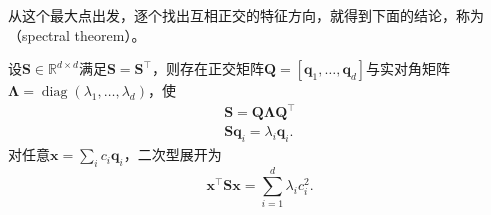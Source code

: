 从这个最大点出发，逐个找出互相正交的特征方向，就得到下面的结论，称为（spectral theorem）。

\begin{theorem}[谱定理]
\label{thm:ls-real-symmetric-spectral}
\label{thm:matrix-analysis-symmetric-spectral-theorem}
\label{sec:ch06-triangular-spectrum}
设$\bm S\in\mathbb R^{d\times d}$满足$\bm S=\bm S^\top$，则存在正交矩阵$\bm Q=[\bm q_1,\ldots,\bm q_d]$与实对角矩阵$\bm\Lambda=\operatorname{diag}(\lambda_1,\dots,\lambda_d)$，使
\begin{equation}
\begin{gathered}
\bm S=\bm Q\bm\Lambda\bm Q^\top\\
\bm S\bm q_i=\lambda_i\bm q_i.
\end{gathered}
\label{eq:matrix-analysis-symmetric-eigendecomposition}
\end{equation}
对任意$\bm x=\sum_i c_i\bm q_i$，二次型展开为
\begin{equation}
 \bm x^\top\bm S\bm x=\sum_{i=1}^d\lambda_i c_i^2.
 \label{eq:matrix-analysis-quadratic-spectral-form}
\end{equation}
\end{theorem}

